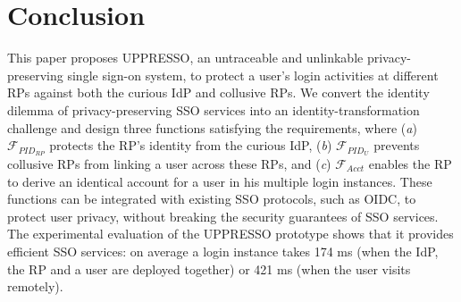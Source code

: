 \section{Conclusion}
\label{sec:conclusion}
This paper proposes UPPRESSO, an untraceable and unlinkable privacy-preserving single sign-on system,
 to protect a user's login activities at different RPs against both the curious IdP and collusive RPs.
We convert the identity dilemma of privacy-preserving SSO services into an identity-transformation challenge
 and design three functions satisfying the requirements,
 where (\emph{a}) $\mathcal{F}_{PID_{RP}}$ protects the RP's identity from the curious IdP,
(\emph{b})  $\mathcal{F}_{PID_{U}}$ prevents collusive RPs from linking a user across these RPs,
 and (\emph{c}) $\mathcal{F}_{Acct}$ enables the RP to derive an identical account for a user in his multiple login instances.
These functions can be integrated with existing SSO protocols,
    such as OIDC,
    to protect user privacy,
    without breaking the security guarantees of SSO services.
The experimental evaluation of the UPPRESSO prototype shows
 that it provides efficient SSO services:
  on average a login instance takes 174 ms (when the IdP, the RP and a user are deployed together) or 421 ms (when the user visits remotely).



\newpage